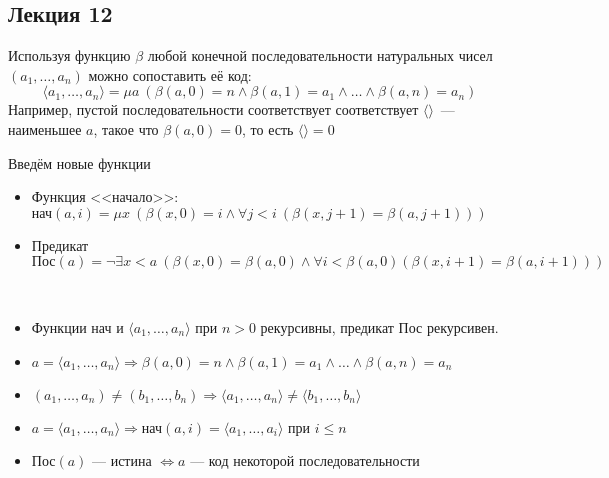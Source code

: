 
\subsection{Лекция 12}

Используя функцию $\beta$ любой конечной последовательности натуральных чисел $(a_1, \ldots, a_n)$ можно сопоставить её код:
$$\langle a_1, \ldots, a_n \rangle = \mu a~(\beta(a, 0)=n\wedge \beta(a, 1)=a_1 \wedge \ldots \wedge \beta(a, n)=a_n)$$
Например, пустой последовательности соответствует соответствует $\langle \rangle $~— наименьшее $a$, такое что $\beta(a, 0)=0$, то есть $\langle \rangle =0$

Введём новые функции 
\begin{itemize}
    \item Функция <<начало>>: $\text{нач}(a, i)=\mu x~(\beta(x, 0)=i\wedge \forall j<i~(\beta(x, j+1)=\beta(a, j+1)))$
    \item Предикат $\text{Пос}(a) = \neg \exists x<a ~(\beta(x, 0)=\beta(a, 0)\wedge \forall i<\beta(a, 0) (\beta(x, i+1)=\beta(a, i+1)))$ %
\end{itemize}

\begin{prop}\
    \begin{itemize}
        \item Функции $\text{нач}$ и $\langle a_1, \ldots, a_n \rangle $ при $n>0$ рекурсивны, предикат $\text{Пос}$ рекурсивен.
        \item $a=\langle a_1, \ldots, a_n \rangle \Rightarrow \beta(a, 0)=n\wedge\beta(a, 1)=a_1\wedge\ldots\wedge \beta(a, n)=a_n$
        \item $(a_1, \ldots, a_n)\ne(b_1, \ldots, b_n) \Rightarrow \langle a_1, \ldots, a_n\rangle \ne\langle b_1, \ldots, b_n\rangle $
        \item $a = \langle a_1, \ldots, a_n \rangle \Rightarrow \text{нач}(a, i)=\langle a_1, \ldots, a_i\rangle $ при $i\le n$
        \item $\text{Пос}(a)\text{~— истина } \Leftrightarrow a \text{~— код некоторой последовательности}$
    \end{itemize}
\end{prop}

